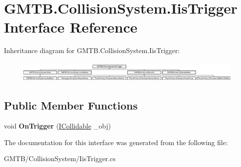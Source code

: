 \hypertarget{interface_g_m_t_b_1_1_collision_system_1_1_iis_trigger}{}\section{G\+M\+T\+B.\+Collision\+System.\+Iis\+Trigger Interface Reference}
\label{interface_g_m_t_b_1_1_collision_system_1_1_iis_trigger}
Inheritance diagram for G\+M\+T\+B.\+Collision\+System.\+Iis\+Trigger\+:\begin{figure}[H]
\begin{center}
\leavevmode
\includegraphics[height=1.064639cm]{interface_g_m_t_b_1_1_collision_system_1_1_iis_trigger}
\end{center}
\end{figure}
\subsection*{Public Member Functions}
\begin{DoxyCompactItemize}
\item 
\mbox{\label{interface_g_m_t_b_1_1_collision_system_1_1_iis_trigger_ac495f8b7b454d4c0381aa680d06b9c5e}} 
void {\bfseries On\+Trigger} (\mbox{\hyperlink{interface_g_m_t_b_1_1_collision_system_1_1_i_collidable}{I\+Collidable}} \+\_\+obj)
\end{DoxyCompactItemize}


The documentation for this interface was generated from the following file\+:\begin{DoxyCompactItemize}
\item 
G\+M\+T\+B/\+Collision\+System/Iis\+Trigger.\+cs\end{DoxyCompactItemize}
